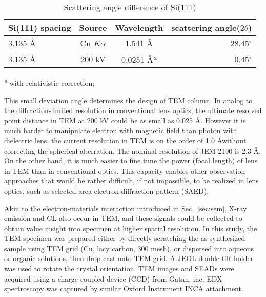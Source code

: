 \begin{table}[htb]
\centering
\caption{Scattering angle difference of Si(111)}\label{tab:ch2tem}
\begin{tabular}{lccr}
\toprule
Si(111) spacing & Source & Wavelength & scattering angle($2\theta$) \\
\midrule
3.135 \AA & Cu $K\alpha$ & 1.541 \AA & 28.45$^\circ$  \\
3.135 \AA & 200 kV & 0.0251 \AA \textsuperscript{\emph{a}}& 0.45$^\circ$  \\
\bottomrule
\end{tabular}

 \textsuperscript{\emph{a}} with relativistic correction;
\end{table}

This small deviation angle determines the design of TEM column. In analog to the diffraction-limited resolution in conventional lens optics, the ultimate resolved point distance in TEM at 200 kV could be as small as 0.025 \AA. However it is much harder to manipulate electron with magnetic field than photon with dielectric lens, the current resolution in TEM is on the order of 1.0 \AA without correcting the spherical aberration. The nominal resolution of JEM-2100 is 2.3 \AA. On the other hand, it is much easier to fine tune the power (focal length) of lens in TEM than in conventional optics. This capacity enables other observation approaches that would be rather difficult, if not impossible, to be realized in lens optics, such as selected area electron diffraction pattern (SAED). 

Akin to the electron-materials interaction introduced in Sec.~\ref{sec:sem}, X-ray emission and CL also occur in TEM, and these signals could be collected to obtain value insight into specimen at higher spatial resolution. In this study, the TEM specimen was prepared either by directly scratching the as-synthesized sample using TEM grid (Cu, lacy carbon, 300 mesh), or dispersed into aqueous or organic solutions, then drop-cast onto TEM grid. A JEOL double tilt holder was used to rotate the crystal orientation. TEM images and SEADs were acquired using a charge coupled device (CCD) from Gatan, inc. EDX spectroscopy was captured by similar Oxford Instrument INCA attachment. 

